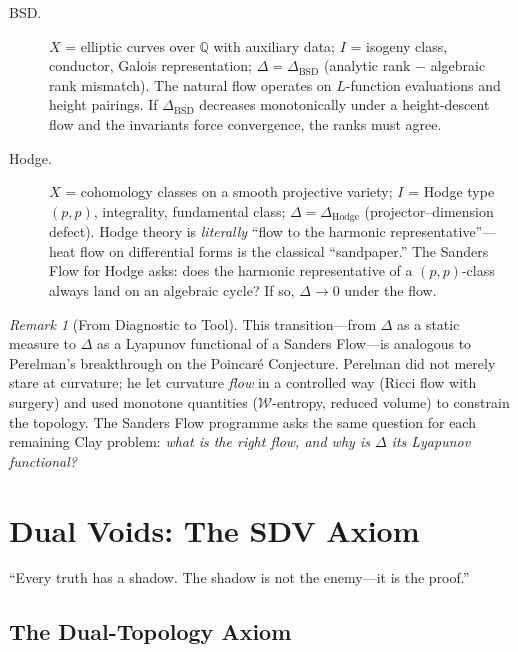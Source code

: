 \documentclass[12pt, openany]{book}
\theoremstyle{remark}
\newtheorem{remark}[theorem]{Remark}
\begin{document}
\begin{description}
\item[BSD.]
$X$ = elliptic curves over $\mathbb{Q}$ with auxiliary data;
$I$ = isogeny class, conductor, Galois representation;
$\Delta = \Delta_{\mathrm{BSD}}$ (analytic rank $-$ algebraic rank mismatch).
The natural flow operates on $L$-function evaluations and height pairings.
If $\Delta_{\mathrm{BSD}}$ decreases monotonically under a height-descent flow and
the invariants force convergence, the ranks must agree.

\item[Hodge.]
$X$ = cohomology classes on a smooth projective variety;
$I$ = Hodge type $(p,p)$, integrality, fundamental class;
$\Delta = \Delta_{\mathrm{Hodge}}$ (projector--dimension defect).
Hodge theory is \emph{literally} ``flow to the harmonic representative''---heat flow
on differential forms is the classical ``sandpaper.''  The Sanders Flow for Hodge
asks: does the harmonic representative of a $(p,p)$-class always land on an algebraic
cycle?  If so, $\Delta \to 0$ under the flow.

\end{description}

\begin{remark}[From Diagnostic to Tool]
This transition---from $\Delta$ as a static measure to $\Delta$ as a Lyapunov functional
of a Sanders Flow---is analogous to Perelman's breakthrough on the Poincar\'e Conjecture.
Perelman did not merely stare at curvature; he let curvature \emph{flow} in a controlled
way (Ricci flow with surgery) and used monotone quantities ($\mathcal{W}$-entropy,
reduced volume) to constrain the topology.  The Sanders Flow programme asks the same
question for each remaining Clay problem: \emph{what is the right flow, and why is
$\Delta$ its Lyapunov functional?}
\end{remark}


\chapter{Dual Voids: The SDV Axiom}
\label{ch:sdv}

\epigraph{``Every truth has a shadow. The shadow is not the enemy---it is the proof.''}{}

\section{The Dual-Topology Axiom}
\end{document}
